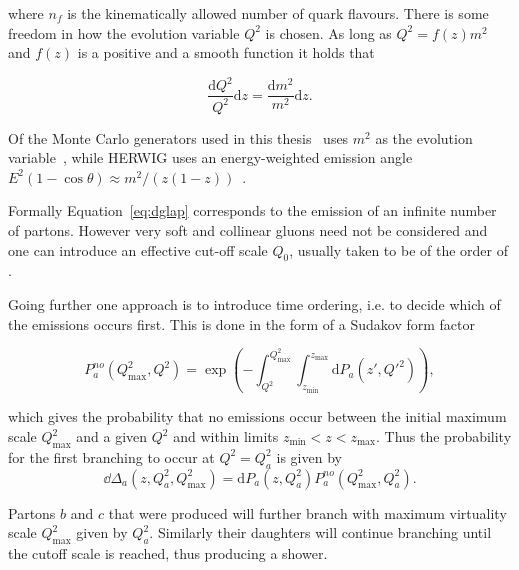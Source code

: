 \noindent where $n_f$ is the kinematically allowed number of quark flavours. There is some freedom in how the evolution variable $Q^2$ is chosen. As long as $Q^2=f\left(z \right) m^2$ and $f\left(z \right)$ is a positive and a smooth function it holds that

\begin{equation}
\frac{\mathrm{d}Q^2}{Q^2}\mathrm{d}z = \frac{\mathrm{d} m^2}{m^2} \mathrm{d}z. 
\end{equation}

\noindent Of the Monte Carlo generators used in this thesis \pythia~uses $m^2$ as the evolution variable~\cite{introPythia82}, while HERWIG uses an energy-weighted emission angle $E^2\left(1-\cos\theta\right) \approx m^2/\left(z\left(1-z\right)\right)$~\cite{herwigManual}.

Formally Equation~\ref{eq:dglap} corresponds to the emission of an infinite number of partons. However very soft and collinear gluons need not be considered and one can introduce an effective cut-off scale $Q_0$, usually taken to be of the order of \unit[1]{\gev}.

Going further one approach is to introduce time ordering, i.e. to decide which of the emissions occurs first. This is done in the form of a Sudakov form factor~\cite{eventGenerators}

\begin{equation}
P_a^{no}\left(Q^2_\mathrm{max},Q^2\right) = \exp \left(- \int_{Q^2}^{Q^2_\mathrm{max}}\int_{z_\mathrm{min}}^{z_\mathrm{max}} \mathrm{d} P_a \left(z',Q'^2\right)\right),
\end{equation} 

\noindent which gives the probability that no emissions occur between the initial maximum scale $Q^2_\mathrm{max}$ and a given $Q^2$ and within limits $z_\mathrm{min} < z < z_\mathrm{max}$. Thus the probability for the first branching to occur at $Q^2=Q^2_a$ is given by 
\begin{equation}
\dd \Delta_a\left(z,Q_a^2,Q_\mathrm{max}^2\right)=\mathrm{d}P_a \left(z,Q^2_a\right) P_a^{no}\left(Q^2_\mathrm{max},Q_a^2\right).
\end{equation}

Partons $b$ and $c$ that were produced will further branch with maximum virtuality scale $Q^2_\mathrm{max}$ given by $Q^2_a$. Similarly their daughters will continue branching until the cutoff scale is reached, thus producing a shower. 

